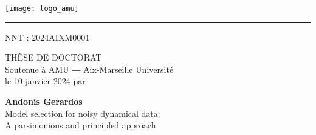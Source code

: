 \chead{}
\thispagestyle{empty}

\vspace{1em}

\begin{center}
	\begin{minipage}[c]{.5\linewidth}
		\raggedright\texttt{[image: logo\_amu]}
	\end{minipage}\hfill
	\begin{minipage}[c]{.5\linewidth}
	\end{minipage}\hfill
\end{center}


\begin{center}
	\begin{minipage}[c]{.77\linewidth}
		\textcolor{yellowamu}{\noindent\rule{\textwidth}{4pt}}
	\end{minipage}\hfill
	\begin{minipage}[c]{.23\linewidth}
		\raggedleft\textsf{NNT : 2024AIXM0001}
	\end{minipage}\hfill
\end{center}


\doublespacing
\begin{flushleft}
    \textsf{\HUGE\textcolor{blueamu}{THÈSE DE DOCTORAT}}\\
	\textsf{\Large Soutenue à AMU ― Aix-Marseille Université}\\
	\textsf{\Large le 10 janvier 2024 par}\\
\end{flushleft}
\vspace{2em}
\begin{center}
	\textsf{\textbf{\Huge Andonis Gerardos}}\\
    \vspace{1em}
	\textsf{\LARGE Model selection for noisy dynamical data:}\\ 
	\textsf{\Large A parsimonious and principled approach}\\
\end{center}
\singlespacing

